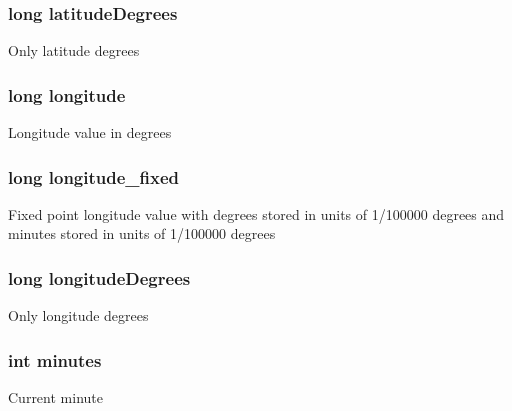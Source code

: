 \subsubsection[{latitude\+Degrees}]{\setlength{\rightskip}{0pt plus 5cm}long latitude\+Degrees}\label{struct_current_gps_reading_aa3c709569d317a96ed8adb103f97f92b}
Only latitude degrees \hypertarget{struct_current_gps_reading_ad3da7a89e7a97e8ccb592897339bf9c1}{}
\subsubsection[{longitude}]{\setlength{\rightskip}{0pt plus 5cm}long longitude}\label{struct_current_gps_reading_ad3da7a89e7a97e8ccb592897339bf9c1}
Longitude value in degrees \hypertarget{struct_current_gps_reading_a98f8cd096504fecb797f338438cad86f}{}
\subsubsection[{longitude\+\_\+fixed}]{\setlength{\rightskip}{0pt plus 5cm}long longitude\+\_\+fixed}\label{struct_current_gps_reading_a98f8cd096504fecb797f338438cad86f}
Fixed point longitude value with degrees stored in units of 1/100000 degrees and minutes stored in units of 1/100000 degrees \hypertarget{struct_current_gps_reading_a945cd91f9de479289bc93bc4018e978d}{}
\subsubsection[{longitude\+Degrees}]{\setlength{\rightskip}{0pt plus 5cm}long longitude\+Degrees}\label{struct_current_gps_reading_a945cd91f9de479289bc93bc4018e978d}
Only longitude degrees \hypertarget{struct_current_gps_reading_ab693b677bdc9ded12b06daf49778101c}{}
\subsubsection[{minutes}]{\setlength{\rightskip}{0pt plus 5cm}int minutes}\label{struct_current_gps_reading_ab693b677bdc9ded12b06daf49778101c}
Current minute \hypertarget{struct_current_gps_reading_aa17df66ce835adf67ec6fbaf721b62c6}{}
